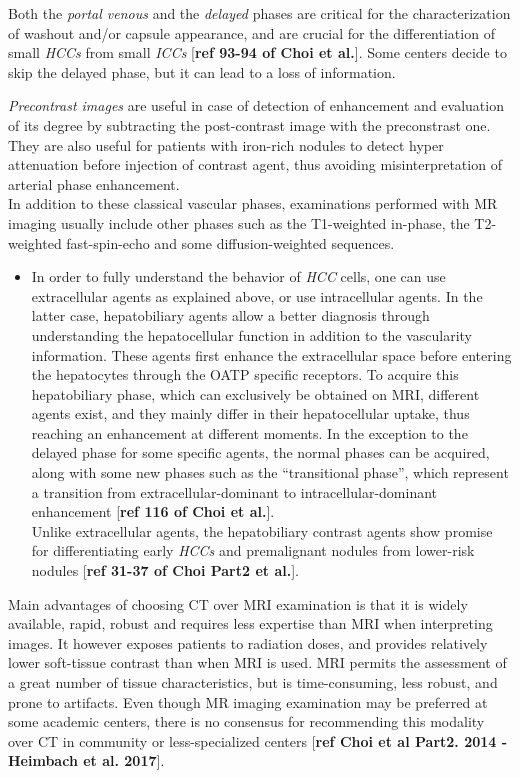 \documentclass[]{article}
\providecommand{\tightlist}{%
  \setlength{\itemsep}{0pt}\setlength{\parskip}{0pt}}
\begin{document}
Both the \emph{portal venous} and the \emph{delayed} phases are critical
for the characterization of washout and/or capsule appearance, and are
crucial for the differentiation of small \emph{HCCs} from small
\emph{ICCs} {[}\textbf{ref 93-94 of Choi et al.}{]}. Some centers decide
to skip the delayed phase, but it can lead to a loss of information.

\emph{Precontrast images} are useful in case of detection of enhancement
and evaluation of its degree by subtracting the post-contrast image with
the preconstrast one. They are also useful for patients with iron-rich
nodules to detect hyper attenuation before injection of contrast agent,
thus avoiding misinterpretation of arterial phase enhancement.\\
In addition to these classical vascular phases, examinations performed
with MR imaging usually include other phases such as the T1-weighted
in-phase, the T2-weighted fast-spin-echo and some diffusion-weighted
sequences.\\

\begin{itemize}
\tightlist
\item
  In order to fully understand the behavior of \emph{HCC} cells, one can
  use extracellular agents as explained above, or use intracellular
  agents. In the latter case, hepatobiliary agents allow a better
  diagnosis through understanding the hepatocellular function in
  addition to the vascularity information. These agents first enhance
  the extracellular space before entering the hepatocytes through the
  OATP specific receptors. To acquire this hepatobiliary phase, which
  can exclusively be obtained on MRI, different agents exist, and they
  mainly differ in their hepatocellular uptake, thus reaching an
  enhancement at different moments. In the exception to the delayed
  phase for some specific agents, the normal phases can be acquired,
  along with some new phases such as the ``transitional phase'', which
  represent a transition from extracellular-dominant to
  intracellular-dominant enhancement {[}\textbf{ref 116 of Choi et
  al.}{]}.\\
  Unlike extracellular agents, the hepatobiliary contrast agents show
  promise for differentiating early \emph{HCCs} and premalignant nodules
  from lower-risk nodules {[}\textbf{ref 31-37 of Choi Part2 et
  al.}{]}.\\
\end{itemize}

Main advantages of choosing CT over MRI examination is that it is widely
available, rapid, robust and requires less expertise than MRI when
interpreting images. It however exposes patients to radiation doses, and
provides relatively lower soft-tissue contrast than when MRI is used.
MRI permits the assessment of a great number of tissue characteristics,
but is time-consuming, less robust, and prone to artifacts. Even though
MR imaging examination may be preferred at some academic centers, there
is no consensus for recommending this modality over CT in community or
less-specialized centers {[}\textbf{ref Choi et al Part2. 2014 -
Heimbach et al. 2017}{]}.
\end{document}
